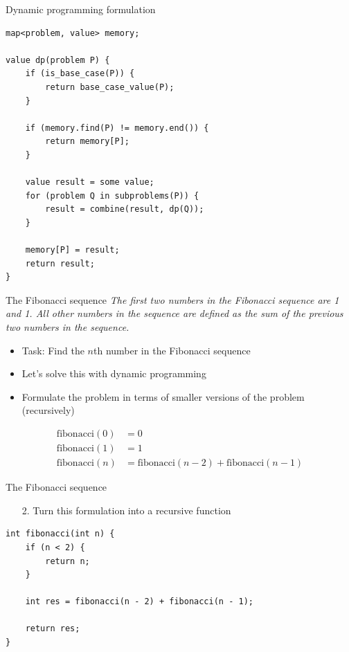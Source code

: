 \documentclass{beamer}
\begin{document}
\begin{frame}{Dynamic programming formulation}
    \begin{verbatim}
map<problem, value> memory;

value dp(problem P) {
    if (is_base_case(P)) {
        return base_case_value(P);
    }

    if (memory.find(P) != memory.end()) {
        return memory[P];
    }

    value result = some value;
    for (problem Q in subproblems(P)) {
        result = combine(result, dp(Q));
    }

    memory[P] = result;
    return result;
}
    \end{verbatim}
\end{frame}

\begin{frame}[plain]{The Fibonacci sequence}
    \vspace{5pt}
    \textit{The first two numbers in the Fibonacci sequence are 1 and 1. All
            other numbers in the sequence are defined as the sum of the previous two
            numbers in the sequence.}

    \vspace{5pt}
    \begin{itemize}
        \item Task: Find the $n$th number in the Fibonacci sequence
        \item Let's solve this with dynamic programming
    \end{itemize}

    \vspace{5pt}
    \begin{itemize}
        \item Formulate the problem in terms of smaller versions of the problem (recursively)
    \end{itemize}

    \begin{align*}
        \mathrm{fibonacci}(0) &= 0\\
        \mathrm{fibonacci}(1) &= 1\\
        \mathrm{fibonacci}(n) &= \mathrm{fibonacci}(n - 2) + \mathrm{fibonacci}(n - 1)
    \end{align*}
\end{frame}

\begin{frame}{The Fibonacci sequence}
    \begin{itemize}
        \item[2.] Turn this formulation into a recursive function
    \end{itemize}

    \begin{verbatim}
int fibonacci(int n) {
    if (n < 2) {
        return n;
    }

    int res = fibonacci(n - 2) + fibonacci(n - 1);

    return res;
}
    \end{verbatim}
\end{frame}
\end{document}
